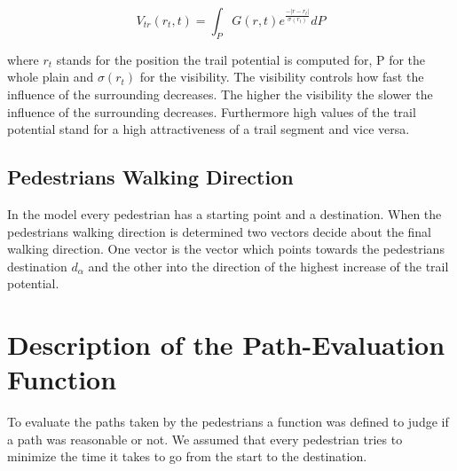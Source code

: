 \begin{equation}
V_{tr}(r_t,t) = \int_{P} G(r,t) e^{\frac{-|r-r_t|}{\sigma(r_t)}} dP
\end{equation}

where $r_t$ stands for the position the trail potential is computed for, P for the whole plain and $\sigma(r_t)$ for the visibility. The visibility controls how fast the influence of the surrounding decreases. The higher the visibility the slower the influence of the surrounding decreases. Furthermore high values of the trail potential stand for a high attractiveness of a trail segment and vice versa. 

\subsection{Pedestrians Walking Direction}
\label{pedestrians_direction}

In the model every pedestrian has a starting point and a destination. When the pedestrians walking direction is determined two vectors decide about the final walking direction. One vector is the vector which points towards the pedestrians destination $d_{\alpha}$ and the other into the direction of the highest increase of the trail potential.

\section{Description of the Path-Evaluation Function}

To evaluate the paths taken by the pedestrians a function was defined to judge if a path was reasonable or not. We assumed that every pedestrian tries to minimize the time it takes to go from the start to the destination.